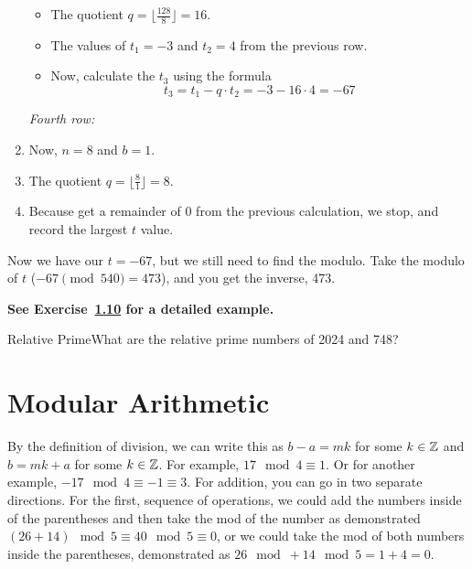 \begin{enumerate}[label=\arabic*.]
\begin{itemize}
              \item The quotient \(q = \lfloor \frac{128}{8} \rfloor = 16\).
              \item The values of \(t_1 = -3\) and \(t_2 = 4\) from the previous row.
              \item Now, calculate the \(t_3\) using the formula
                    \[
                        t_3 = t_1 - q \cdot t_2 = -3 - 16 \cdot 4 = -67
                    \]
          \end{itemize}
          \textit{Fourth row:}
    \item Now, \(n = 8\) and \(b = 1\).
    \item The quotient \(q = \lfloor \frac{8}{1} \rfloor = 8\).
    \item Because get a remainder of 0 from the previous calculation, we stop, and record the largest \(t\) value.
\end{enumerate}
Now we have our \(t = -67\), but we still need to find the modulo. Take the modulo of \(t\) (\(-67 \pmod{540} = 473\)), and you get the inverse, 473.

\textbf{See Exercise~\hyperlink{exerc:1.10}{1.10} for a detailed example.}

\begin{example}
    {Relative Prime}What are the relative prime numbers of 2024 and 748?
\end{example}


\section{Modular Arithmetic}


By the definition of division, we can write this as \(b - a = mk\) for some \(k \in \mathbb{Z}\) and \(b = mk + a\) for some \(k \in \mathbb{Z}\). For example, \(17\mod 4 \equiv 1\). Or for another example, \(-17\mod 4 \equiv -1 \equiv 3\). For addition, you can go in two separate directions. For the first, sequence of operations, we could add the numbers inside of the parentheses and then take the mod of the number as demonstrated \((26 + 14)\mod 5 \equiv 40 \mod 5 \equiv 0\), or we could take the mod of both numbers inside the parentheses, demonstrated as \(26\mod + 14\mod 5 = 1 + 4 = 0\). \\

